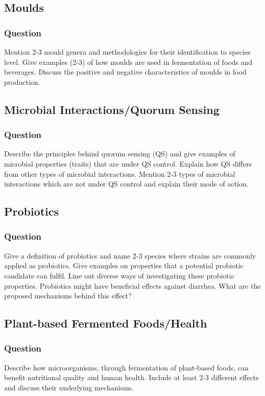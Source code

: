 \subsection{Moulds}
\subsubsection*{Question}
Mention 2-3 mould genera and methodologies for their identification to species level. Give examples (2-3) of how moulds are used in fermentation of foods and beverages. Discuss the positive and negative characteristics of moulds in food production. 

\subsection{Microbial Interactions/Quorum Sensing}
\subsubsection*{Question}
Describe the principles behind quorum sensing (QS) and give examples of microbial properties (traits) that are under QS control. Explain how QS differs from other types of microbial interactions. Mention 2-3 types of microbial interactions which are not under QS control and explain their mode of action.  

\subsection{Probiotics}
\subsubsection*{Question}
Give a definition of probiotics and name 2-3 species where strains are commonly applied as probiotics. Give examples on properties that a potential probiotic candidate can fulfil. Line out diverse ways of investigating these probiotic properties. Probiotics might have beneficial effects against diarrhea. What are the proposed mechanisms behind this effect?

\subsection{Plant-based Fermented Foods/Health}
\subsubsection*{Question}
Describe how microorganisms, through fermentation of plant-based foods, can benefit nutritional quality and human health. Include at least 2-3 different effects and discuss their underlying mechanisms. 

